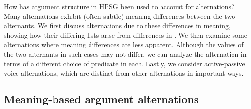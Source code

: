 \documentclass[output=paper,biblatex,babelshorthands,newtxmath,draftmode,colorlinks, citecolor=brown]{langscibook}
\begin{document}
%

How has argument structure in HPSG been used to account for alternations?
Many alternations exhibit (often subtle) meaning differences between the two 
alternants.
We first discuss alternations due to these differences in meaning, showing how their differing \argst lists arise from differences in .  
We then examine some alternations where meaning differences are less apparent.
Although the  values of the two alternants in such cases may not differ, we can analyze the alternation in terms of a different choice of  predicate in each.
Lastly, we consider active-passive voice alternations, which are distinct from other alternations in important ways.

\subsection{Meaning-based argument alternations}
\end{document}
